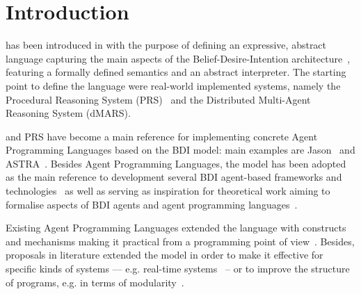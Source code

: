 \section{Introduction}
\label{sec:intro}


%
%
{\asl} has been introduced in \cite{Rao96}  with the purpose of defining an expressive, 
abstract language capturing the main aspects of the Belief-Desire-Intention architecture~\cite{Bratman88,Georgeff:1987:RRP:1863766.1863818}, featuring a formally defined semantics and an abstract interpreter.
%
The starting point to define the language were real-world implemented systems, namely the
Procedural Reasoning System (PRS)~\cite{Ingrand:1992:ARR:629535.629890} and the Distributed Multi-Agent Reasoning System (dMARS).
%

%
% 
{\asl}  and PRS have become a main reference for implementing concrete Agent Programming Languages 
based on the BDI model: 
%
main examples are Jason~\cite{jason06,bordini:07} and ASTRA~\cite{DBLP:conf/prima/CollierRL15}.
%
Besides Agent Programming Languages, the {\asl} model has been adopted
as the main reference to development several BDI agent-based
frameworks and technologies~\cite{BordiniMAPlpa,BordiniMAPlta} as well
as serving as inspiration for theoretical work aiming to formalise
aspects of BDI agents and agent programming
languages~\cite{DBLP:conf/kr/WinikoffPHT02,DBLP:conf/promas/DennisFBFW07,DBLP:journals/aamas/BordiniFVW06}.


%
%
Existing Agent Programming Languages extended the language with
constructs and mechanisms making it practical from a programming point
of view~\cite{jason06}.
%
Besides, proposals in literature extended the model in order to make
it effective for specific kinds of systems --- e.g. real-time
systems~\cite{Vikhorev:2011:APP:2030470.2030529} -- or to
improve the structure of programs, e.g. in terms of
modularity~\cite{Madden2010,Nunes2014}.

